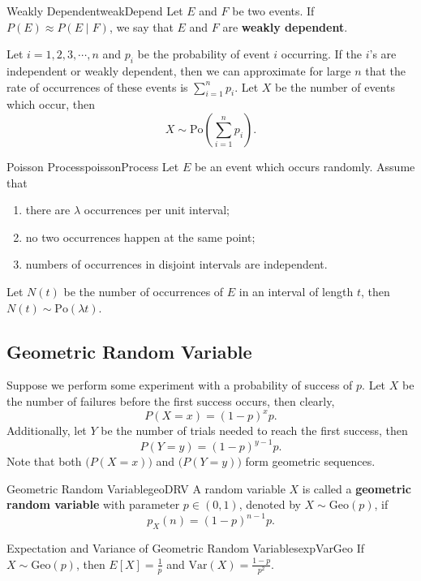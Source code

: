 \documentclass[math]{amznotes}
\theoremstyle{remark}
\begin{document}
\begin{dfnbox}{Weakly Dependent}{weakDepend}
    Let $E$ and $F$ be two events. If $P(E) \approx P(E\mid F)$, we say that $E$ and $F$ are {\color{red} \textbf{weakly dependent}}.
\end{dfnbox}
Let $i = 1, 2, 3, \cdots, n$ and $p_i$ be the probability of event $i$ occurring. If the $i$'s are independent or weakly dependent, then we can approximate for large $n$ that the rate of occurrences of these events is $\sum_{i = 1}^{n}p_i$. Let $X$ be the number of events which occur, then 
\begin{equation*}
    X \sim \mathrm{Po}\left(\sum_{i = 1}^{n}p_i\right).
\end{equation*}
\begin{thmbox}{Poisson Process}{poissonProcess}
    Let $E$ be an event which occurs randomly. Assume that
    \begin{enumerate}
        \item there are $\lambda$ occurrences per unit interval;
        \item no two occurrences happen at the same point;
        \item numbers of occurrences in disjoint intervals are independent.
    \end{enumerate}
    Let $N(t)$ be the number of occurrences of $E$ in an interval of length $t$, then $N(t) \sim \mathrm{Po}(\lambda t)$.
\end{thmbox}

\subsection{Geometric Random Variable}
Suppose we perform some experiment with a probability of success of $p$. Let $X$ be the number of failures before the first success occurs, then clearly,
\begin{equation*}
    P(X = x) = (1 - p)^xp.
\end{equation*}
Additionally, let $Y$ be the number of trials needed to reach the first success, then
\begin{equation*}
    P(Y = y) = (1 - p)^{y - 1}p.
\end{equation*}
Note that both $\bigl(P(X = x)\bigr)$ and $\bigl(P(Y = y)\bigr)$ form geometric sequences.
\begin{dfnbox}{Geometric Random Variable}{geoDRV}
    A random variable $X$ is called a {\color{red} \textbf{geometric random variable}} with parameter $p \in (0, 1)$, denoted by $X \sim \mathrm{Geo}(p)$, if
    \begin{equation*}
        p_X(n) = (1 - p)^{n - 1}p.
    \end{equation*}
\end{dfnbox}
\begin{thmbox}{Expectation and Variance of Geometric Random Variables}{expVarGeo}
    If $X \sim \mathrm{Geo}(p)$, then $E[X] = \frac{1}{p}$ and $\mathrm{Var}(X) = \frac{1 - p}{p^2}$.
\end{thmbox}
\end{document}
